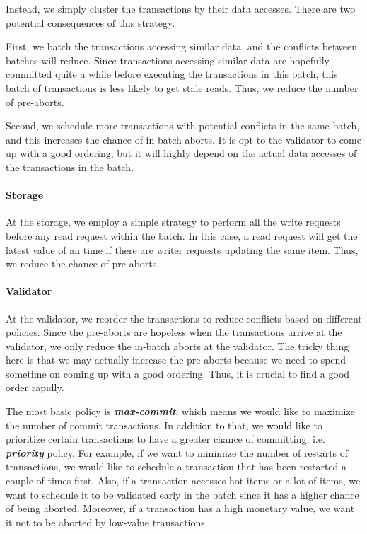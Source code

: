 Instead, we simply cluster the transactions by their data accesses. 
There are two potential consequences of this strategy. 

First, we batch the transactions accessing similar data, and the conflicts between batches will reduce. 
Since transactions accessing similar data are hopefully committed quite a while before executing the transactions in this batch, this batch of transactions is less likely to get stale reads. 
Thus, we reduce the number of pre-aborts. 

Second, we schedule more transactions with potential conflicts in the same batch, and this increases the chance of in-batch aborts. It is opt to the validator to come up with a good ordering, but it will highly depend on the actual data accesses of the transactions in the batch.

\paragraph{Storage}
At the storage, we employ a simple strategy to perform all the write requests before any read request within the batch. 
In this case, a read request will get the latest value of an time if there are writer requests updating the same item.
Thus, we reduce the chance of pre-aborts.


\paragraph{Validator}
At the validator, we reorder the transactions to reduce conflicts based on different policies. 
Since the pre-aborts are hopeless when the transactions arrive at the validator, we only reduce the in-batch aborts at the validator.
The tricky thing here is that we may actually increase the pre-aborts because we need to spend sometime on coming up with a good ordering. 
Thus, it is crucial to find a good order rapidly.

The most basic policy is \textbf{\emph{max-commit}}, which means we would like to maximize the number of commit transactions.
In addition to that, we would like to prioritize certain transactions to have a greater chance of committing, i.e. \textbf{\emph{priority}} policy.
For example, if we want to minimize the number of restarts of transactions, we would like to schedule a transaction that has been restarted a couple of times first.
Also, if a transaction accesses hot items or a lot of items, we want to schedule it to be validated early in the batch since it has a higher chance of being aborted.
Moreover, if a transaction has a high monetary value, we want it not to be aborted by low-value transactions.

